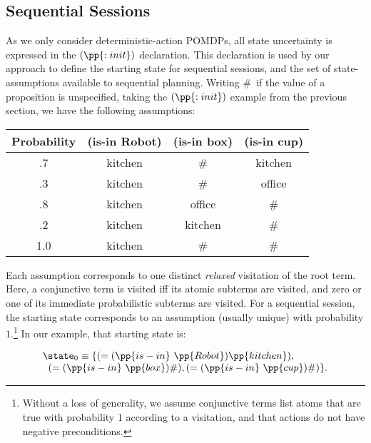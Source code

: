 \subsection{Sequential Sessions}

As we only consider deterministic-action POMDPs, all state
uncertainty is expressed in the $(\pp{:init})$ declaration. This
declaration is used by our approach to define the starting state for
sequential sessions, and the set of state-assumptions available to
sequential planning.  Writing \#\ if the value of a proposition is
unspecified, taking the $(\pp{:init})$ example from the previous
section, we have the following assumptions:

\small
\begin{tabular}{cccc}
\hline
Probability & (is-in Robot)  & (is-in box)  & (is-in cup) \\
\hline
.7 & kitchen & \# &  kitchen\\
.3 & kitchen & \# & office \\
.8 & kitchen & office & \# \\
.2 & kitchen & kitchen & \# \\
1.0 & kitchen & \# & \# \\
\hline
\end{tabular}
\normalsize

\noindent Each assumption corresponds to one distinct {\em
relaxed} visitation of the root term. Here, a conjunctive term is
visited iff its atomic subterms are visited, and zero or one of its
immediate probabilistic subterms are visited. For a sequential
session, the starting state corresponds to an assumption (usually
unique) with probability $1$.\footnote{Without a loss of generality,
we assume conjunctive terms list atoms that are true with
probability 1 according to a visitation, and that actions do not
have negative preconditions.}  In our example, that starting state is:

\vspace{-1ex}

\small
\[
\begin{array}{l}
\state_0 \equiv \{(=(\pp{is-in}~\pp{Robot})\pp{kitchen}),\\
\;\;(=(\pp{is-in}~\pp{box})\#), (=(\pp{is-in}~\pp{cup})\#)\}.
\end{array}
\]
\normalsize

\vspace{-1ex}

